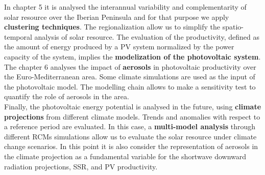   In chapter 5 it is analysed the interannual variability and complementarity of solar resource over the Iberian Peninsula and for that purpose we apply \textbf{clustering techniques}. The regionalization allow us to simplify the spatio-temporal analysis of solar resource. The evaluation of the productivity, defined as the amount of energy produced by a PV system normalized by the power capacity of the system, implies the \textbf{modelization of the photovoltaic system}.\\
  
  The chapter 6 analyses the impact of \textbf{aerosols} in photovoltaic productivity over the Euro-Mediterranean area.  Some climate simulations are used as the input of the photovoltaic model. The modelling chain allows to make a sensitivity test to quantify the role of aerosols in the area.\\

  
  Finally, the photovoltaic energy potential is analysed in the future, using \textbf{climate projections} from different climate models. Trends and anomalies with respect to a reference period are evaluated. In this case, a \textbf{multi-model analysis} through different RCMs simulations allow us to evaluate the solar resource under climate change scenarios. In this point it is also consider the representation of aerosols in the climate projection as a fundamental variable for the shortwave downward radiation projections, SSR, and PV productivity.\\ 

  
